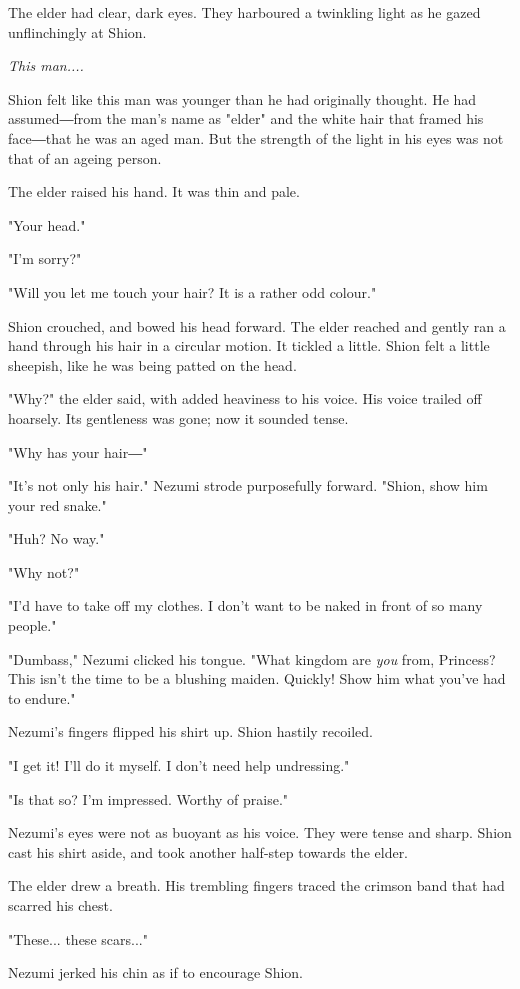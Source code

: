 The elder had clear, dark eyes. They harboured a twinkling light as he
gazed unflinchingly at Shion.

\emph{This man....}

Shion felt like this man was younger than he had originally thought. He
had assumed―from the man's name as "elder" and the white hair that
framed his face―that he was an aged man. But the strength of the light
in his eyes was not that of an ageing person.

The elder raised his hand. It was thin and pale.

"Your head."

"I'm sorry?"

"Will you let me touch your hair? It is a rather odd colour."

Shion crouched, and bowed his head forward. The elder reached and gently
ran a hand through his hair in a circular motion. It tickled a little.
Shion felt a little sheepish, like he was being patted on the head.

"Why?" the elder said, with added heaviness to his voice. His voice
trailed off hoarsely. Its gentleness was gone; now it sounded tense.

"Why has your hair―"

"It's not only his hair." Nezumi strode purposefully forward. "Shion,
show him your red snake."

"Huh? No way."

"Why not?"

"I'd have to take off my clothes. I don't want to be naked in front of
so many people."

"Dumbass," Nezumi clicked his tongue. "What kingdom are \emph{you} from,
Princess? This isn't the time to be a blushing maiden. Quickly! Show him
what you've had to endure."

Nezumi's fingers flipped his shirt up. Shion hastily recoiled.

"I get it! I'll do it myself. I don't need help undressing."

"Is that so? I'm impressed. Worthy of praise."

Nezumi's eyes were not as buoyant as his voice. They were tense and
sharp. Shion cast his shirt aside, and took another half-step towards
the elder.

The elder drew a breath. His trembling fingers traced the crimson band
that had scarred his chest.

"These... these scars..."

Nezumi jerked his chin as if to encourage Shion.

